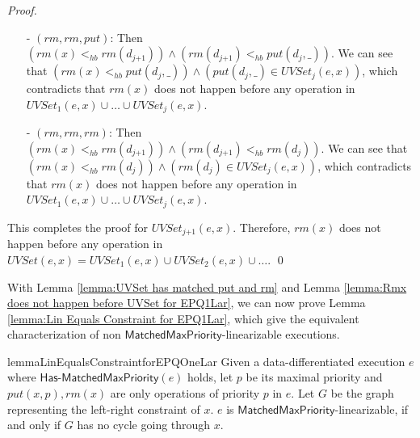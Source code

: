 \begin {proof}
\begin{itemize}
\begin{itemize}
    \item[-] If $\textit{put}(d_{\textit{ind}},\_) <_{hb} \textit{rm}(d_{\textit{ind-1}})$, then we obtain $T_{\textit{ind-1}}$, which already contain contradiction.
    \end{itemize}

    By base case $1$, base case $2$ and the induction step, it is easy to see that for each $i$, $T_i$ contains contradiction. Therefore, $T_j$, the case of $(\textit{rm},\textit{put},\textit{rm})$, contains contradiction.

\item[-] $(\textit{rm},\textit{rm},\textit{put})$: Then $( \textit{rm}(x) <_{hb} \textit{rm}(d_{\textit{j+1}}) ) \wedge ( \textit{rm}(d_{\textit{j+1}}) <_{hb} \textit{put}(d_j,\_) )$. We can see that $( \textit{rm}(x) <_{hb} \textit{put}(d_j,\_) ) \wedge ( \textit{put}(d_j,\_) \in \textit{UVSet}_j(e,x) )$, which contradicts that $\textit{rm}(x)$ does not happen before any operation in $\textit{UVSet}_1(e,x) \cup \ldots \cup \textit{UVSet}_j(e,x)$.

\item[-] $(\textit{rm},\textit{rm},\textit{rm})$: Then $( \textit{rm}(x) <_{hb} \textit{rm}(d_{\textit{j+1}}) ) \wedge ( \textit{rm}(d_{\textit{j+1}}) <_{hb} \textit{rm}(d_j) )$. We can see that $( \textit{rm}(x) <_{hb} \textit{rm}(d_j) ) \wedge ( \textit{rm}(d_j) \in \textit{UVSet}_j(e,x) )$, which contradicts that $\textit{rm}(x)$ does not happen before any operation in $\textit{UVSet}_1(e,x) \cup \ldots \cup \textit{UVSet}_j(e,x)$.
\end{itemize}

This completes the proof for $\textit{UVSet}_{\textit{j+1}}(e,x)$. Therefore, $\textit{rm}(x)$ does not happen before any operation in $\textit{UVSet}(e,x) = \textit{UVSet}_1(e,x) \cup \textit{UVSet}_2(e,x) \cup \ldots$. \qed
\end {proof}

With Lemma \ref{lemma:UVSet has matched put and rm} and Lemma \ref{lemma:Rmx does not happen before UVSet for EPQ1Lar}, we can now prove Lemma \ref{lemma:Lin Equals Constraint for EPQ1Lar}, which give the equivalent characterization of non $\mathsf{MatchedMaxPriority}$-linearizable executions. 

\begin{restatable}{lemma}{LinEqualsConstraintforEPQOneLar}
\label{lemma:Lin Equals Constraint for EPQ1Lar}
Given a data-differentiated execution $e$ where $\mathsf{Has\text{-}MatchedMaxPriority}(e)$ holds, let $p$ be its maximal priority and $\textit{put}(x,p),\textit{rm}(x)$ are only operations of priority $p$ in $e$. Let $G$ be the graph representing the left-right constraint of $x$. $e$ is $\mathsf{MatchedMaxPriority}$-linearizable, if and only if $G$ has no cycle going through $x$. 
\end{restatable}

